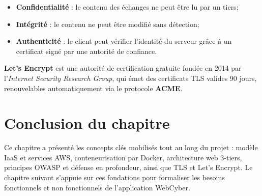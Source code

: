 \begin{itemize}
  \item \textbf{Confidentialité} : le contenu des échanges ne peut être
        lu par un tiers;
  \item \textbf{Intégrité} : le contenu ne peut être modifié sans
        détection;
  \item \textbf{Authenticité} : le client peut vérifier l'identité du
        serveur grâce à un certificat signé par une autorité de
        confiance.
\end{itemize}

\textbf{Let's Encrypt} est une autorité de certification gratuite
fondée en 2014 par l'\emph{Internet Security Research Group}, qui
émet des certificats TLS valides 90 jours, renouvelables
automatiquement via le protocole \textbf{ACME}.

\section{Conclusion du chapitre}

Ce chapitre a présenté les concepts clés mobilisés tout au long du
projet : modèle IaaS et services AWS, conteneurisation par Docker,
architecture web 3-tiers, principes OWASP et défense en profondeur,
ainsi que TLS et Let's Encrypt. Le chapitre suivant s'appuie sur ces
fondations pour formaliser les besoins fonctionnels et non fonctionnels
de l'application WebCyber.
